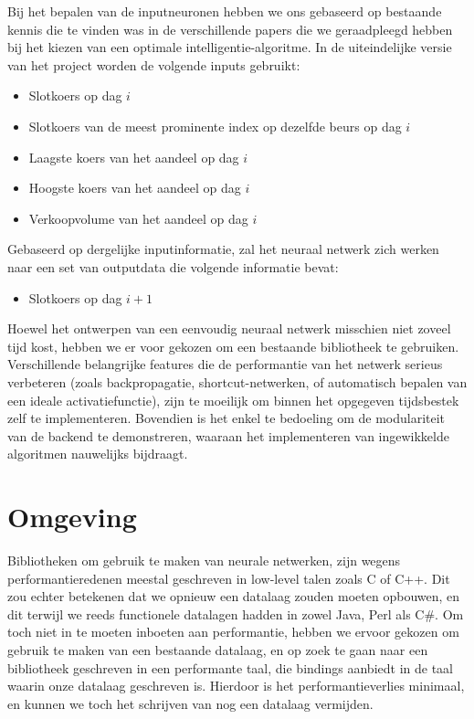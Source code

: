 Bij het bepalen van de inputneuronen hebben we ons gebaseerd op bestaande kennis die te vinden was in de verschillende papers die we geraadpleegd hebben bij het kiezen van een optimale intelligentie-algoritme. In de uiteindelijke versie van het project worden de volgende inputs gebruikt:
\begin{itemize}
\item Slotkoers op dag $i$
\item Slotkoers van de meest prominente index op dezelfde beurs op dag $i$
\item Laagste koers van het aandeel op dag $i$
\item Hoogste koers van het aandeel op dag $i$
\item Verkoopvolume van het aandeel op dag $i$
\end{itemize}

Gebaseerd op dergelijke inputinformatie, zal het neuraal netwerk zich werken naar een set van outputdata die volgende informatie bevat:
\begin{itemize}
\item Slotkoers op dag $i+1$
\end{itemize}

Hoewel het ontwerpen van een eenvoudig neuraal netwerk misschien niet zoveel tijd kost, hebben we er voor gekozen om een bestaande bibliotheek te gebruiken. Verschillende belangrijke features die de performantie van het netwerk serieus verbeteren (zoals backpropagatie, shortcut-netwerken, of automatisch bepalen van een ideale activatiefunctie), zijn te moeilijk om binnen het opgegeven tijdsbestek zelf te implementeren. Bovendien is het enkel te bedoeling om de modulariteit van de backend te demonstreren, waaraan het implementeren van ingewikkelde algoritmen nauwelijks bijdraagt.


\section{Omgeving}

Bibliotheken om gebruik te maken van neurale netwerken, zijn wegens performantieredenen meestal geschreven in low-level talen zoals C of C++. Dit zou echter betekenen dat we opnieuw een datalaag zouden moeten opbouwen, en dit terwijl we reeds functionele datalagen hadden in zowel Java, Perl als C\#. Om toch niet in te moeten inboeten aan performantie, hebben we ervoor gekozen om gebruik te maken van een bestaande datalaag, en op zoek te gaan naar een bibliotheek geschreven in een performante taal, die bindings aanbiedt in de taal waarin onze datalaag geschreven is. Hierdoor is het performantieverlies minimaal, en kunnen we toch het schrijven van nog een datalaag vermijden.

